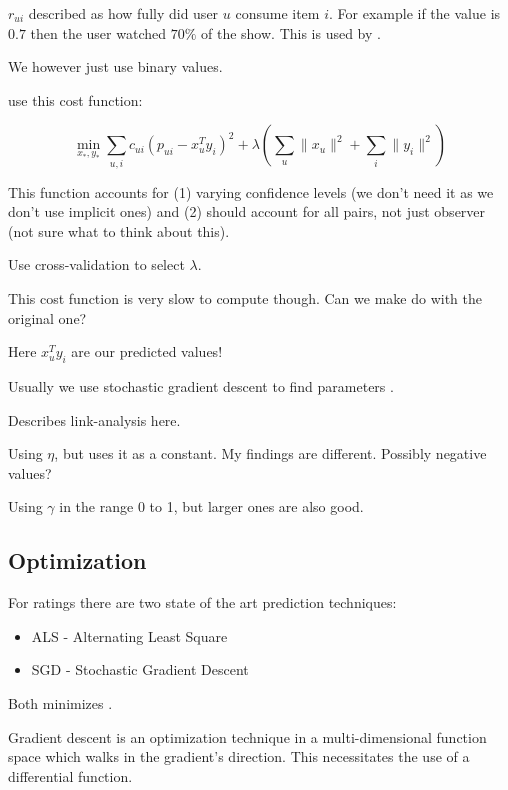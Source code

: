 $r_{ui}$ described as how fully did user $u$ consume item $i$. For example if the value is $0.7$ then the user watched $70\%$ of the show. This is used by \cite{hu2008collaborative}.

We however just use binary values.

\cite{hu2008collaborative} use this cost function:

\begin{equation}
    \min_{x_*, y_*} \sum_{u,i} c_{ui} (p_{ui} - x_{u}^T y_i)^2 + \lambda(\sum_{u} \|x_u\|^2 + \sum_{i} \|y_i\|^2)
\end{equation}

This function accounts for (1) varying confidence levels (we don't need it as we don't use implicit ones) and (2) should account for all pairs, not just observer (not sure what to think about this).

Use cross-validation to select $\lambda$.

This cost function is very slow to compute though. Can we make do with the original one?

Here $x_{u}^T y_i$ are our predicted values!

Usually we use stochastic gradient descent to find parameters \cite{hu2008collaborative}.

Describes link-analysis here.


Using $\eta$, but uses it as a constant. My findings are different. Possibly negative values?

Using $\gamma$ in the range 0 to 1, but larger ones are also good.


\subsection{Optimization}

For ratings there are two state of the art prediction techniques:

\begin{itemize}
    \item ALS - Alternating Least Square
    \item SGD - Stochastic Gradient Descent
\end{itemize}

Both minimizes \rmse.

Gradient descent is an optimization technique in a multi-dimensional function space which walks in the gradient's direction.  This necessitates the use of a differential function.


